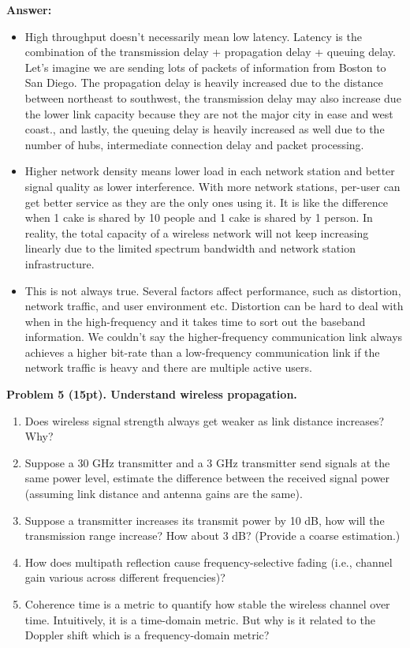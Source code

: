 \documentclass[12pt]{article}
\begin{document}
\textbf{Answer:}
\begin{itemize}
    \item High throughput doesn't necessarily mean low latency. Latency is the combination of the transmission delay + propagation delay + queuing delay. Let's imagine we are sending lots of packets of information from Boston to San Diego. The propagation delay is heavily increased due to the distance between northeast to southwest, the transmission delay may also increase due the lower link capacity because they are not the major city in ease and west coast., and lastly, the queuing delay is heavily increased as well due to the number of hubs, intermediate connection delay and packet processing.
    \item  Higher network density means lower load in each network station and better signal quality as lower interference. With more network stations, per-user can get better service as they are the only ones using it. It is like the difference when 1 cake is shared by 10 people and 1 cake is shared by 1 person. In reality, the total capacity of a wireless network will not keep increasing linearly due to the limited spectrum bandwidth and network station infrastructure.
    \item This is not always true. Several factors affect performance, such as distortion, network traffic, and user environment etc. Distortion can be hard to deal with when in the high-frequency and it takes time to sort out the baseband information. We couldn't say the higher-frequency communication link always achieves a higher bit-rate than a low-frequency communication link if the network traffic is heavy and there are multiple active users.\\
\end{itemize}




\noindent \textbf{Problem 5 (15pt). Understand wireless propagation.\\}
\begin{enumerate}
    \item Does wireless signal strength always get weaker as link distance increases? Why?
    \item Suppose a 30 GHz transmitter and a 3 GHz transmitter send signals at the same power
level, estimate the difference between the received signal power (assuming link distance
and antenna gains are the same).
    \item Suppose a transmitter increases its transmit power by 10 dB, how will the transmission
range increase? How about 3 dB? (Provide a coarse estimation.)
    \item How does multipath reflection cause frequency-selective fading (i.e., channel gain
various across different frequencies)?
    \item Coherence time is a metric to quantify how stable the wireless channel over time.
Intuitively, it is a time-domain metric. But why is it related to the Doppler shift which is
a frequency-domain metric?
 
\end{enumerate}
\end{document}

